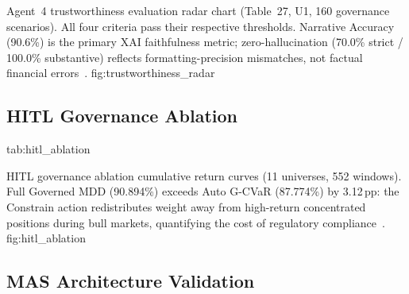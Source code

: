  {Agent~4 trustworthiness evaluation radar chart (Table~27, U1,
   160 governance scenarios). All four criteria pass their respective
   thresholds. Narrative Accuracy (90.6\%) is the primary XAI
   faithfulness metric; zero-hallucination (70.0\% strict /
   100.0\% substantive) reflects formatting-precision mismatches,
   not factual financial errors~\citep{arrieta2020,doshi2017,ji2023}.}
  {fig:trustworthiness_radar}

\subsection{HITL Governance Ablation}

  {tab:hitl_ablation}
  {}

  {HITL governance ablation cumulative return curves (11 universes,
   552 windows). Full Governed MDD (90.894\%) exceeds Auto G-CVaR
   (87.774\%) by 3.12\,pp: the Constrain action redistributes
   weight away from high-return concentrated positions during bull
   markets, quantifying the cost of regulatory compliance~\citep{nystrup2019}.}
  {fig:hitl_ablation}

\subsection{MAS Architecture Validation}

